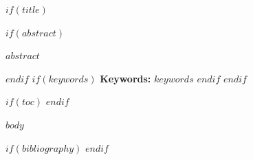 \documentclass[11pt,a4paper]{article}
\makeatletter
\theoremstyle{definition}
\renewenvironment{abstract}{
  \begin{center}
  \begin{minipage}{0.9\textwidth}
  \small
}{
  \end{minipage}
  \end{center}
  \vspace{1em}
}
\def\maketitle{
  \begin{center}
    {\LARGE\bfseries\@title}\par
    \vspace{1em}
    {\large\@author}\par
    \vspace{0.5em}
    {\normalsize\@date}\par
  \end{center}
  \vspace{2em}
}
\makeatother
\begin{document}
$if(title)$
\maketitle
$if(abstract)$
\begin{abstract}
$abstract$
\end{abstract}
$endif$
$if(keywords)$
\noindent\textbf{Keywords:} $keywords$
\vspace{1em}
$endif$
\thispagestyle{fancy}
$endif$

$if(toc)$
\tableofcontents
\newpage
$endif$

$body$

$if(bibliography)$
\printbibliography
$endif$
\end{document}
